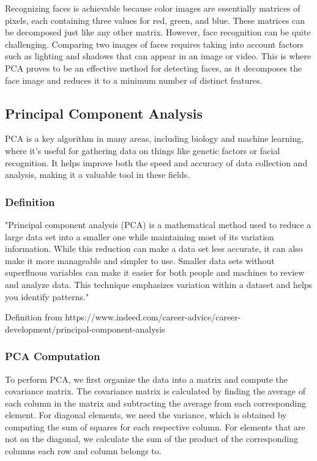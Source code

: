 \documentclass[12pt]{article}
\begin{document}
Recognizing faces is achievable because color images are essentially matrices of pixels, each containing three values for red, green, and blue. These matrices can be decomposed just like any other matrix. However, face recognition can be quite challenging. Comparing two images of faces requires taking into account factors such as lighting and shadows that can appear in an image or video. This is where PCA proves to be an effective method for detecting faces, as it decomposes the face image and reduces it to a minimum number of distinct features.

\subsection{Principal Component Analysis}
PCA is a key algorithm in many areas, including biology and machine learning, where it's useful for gathering data on things like genetic factors or facial recognition. It helps improve both the speed and accuracy of data collection and analysis, making it a valuable tool in these fields.

\subsubsection{Definition}

"Principal component analysis (PCA) is a mathematical method used to reduce a large data set into a smaller one while maintaining most of its variation information. While this reduction can make a data set less accurate, it can also make it more manageable and simpler to use. Smaller data sets without superfluous variables can make it easier for both people and machines to review and analyze data. This technique emphasizes variation within a dataset and helps you identify patterns."
\begin{center}
\tiny Definition from https://www.indeed.com/career-advice/career-development/principal-component-analysis    
\end{center}

\subsubsection{PCA Computation}

\par To perform PCA, we first organize the data into a matrix and compute the covariance matrix. The covariance matrix is calculated by finding the average of each column in the matrix and subtracting the average from each corresponding element. For diagonal elements, we need the variance, which is obtained by computing the sum of squares for each respective column. For elements that are not on the diagonal, we calculate the sum of the product of the corresponding columns each row and column belongs to. \\
\end{document}

